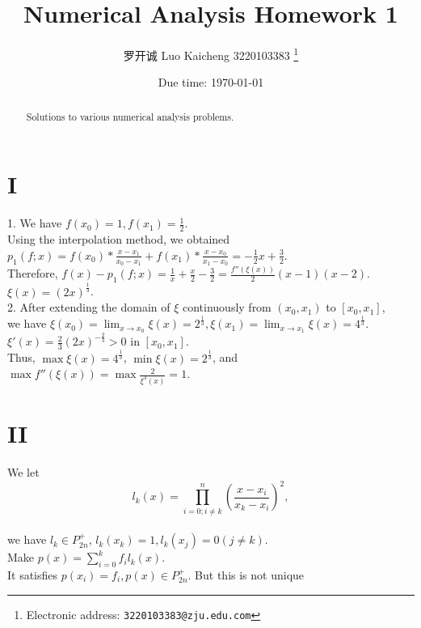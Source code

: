 \documentclass[a4paper]{article}
\begin{document}
\title{Numerical Analysis Homework 1}

\author{罗开诚 Luo Kaicheng 3220103383
  \thanks{Electronic address: \texttt{3220103383@zju.edu.com}}}

\date{Due time: \today}

\maketitle

\begin{abstract}
    Solutions to various numerical analysis problems.
\end{abstract}


\section*{I}
1. We have \( f(x_0) = 1, f(x_1) = \frac{1}{2} \). \\
Using the interpolation method, we obtained \\
\( p_1(f; x) = f(x_0)*\frac{x-x_1}{x_0-x_1}+f(x_1)*\frac{x-x_0}{x_1-x_0}= -\frac{1}{2}x + \frac{3}{2} \). \\
Therefore, \( f(x) - p_1(f; x) = \frac{1}{x} + \frac{x}{2} - \frac{3}{2} = \frac{f''(\xi(x))}{2}(x - 1)(x - 2) \). \\
\( \xi(x) = (2x)^{\frac{1}{3}} \).
\\
2. After extending the domain of \( \xi \) continuously from \( (x_0, x_1) \) to \( [x_0, x_1] \), \\
we have \( \xi(x_0) = \lim_{x \to x_0} \xi(x) = 2^{\frac{1}{3}}, \xi(x_1) = \lim_{x \to x_1} \xi(x) = 4^{\frac{1}{3}} \). \( \xi'(x) = \frac{2}{3}(2x)^{-\frac{2}{3}} > 0 \) in \( [x_0, x_1] \).\\
 Thus, \( \max \xi(x) = 4^{\frac{1}{3}} \), \( \min \xi(x) = 2^{\frac{1}{3}} \), and \( \max f''(\xi(x)) = \max \frac{2}{\xi^3(x)} = 1 \).
\\
\section*{II}
We let
\[
l_k(x) = \prod_{i=0; i \neq k}^n \left( \frac{x - x_i}{x_k - x_i} \right)^2,
\]
\\we have \( l_k \in P_{2n}^{+} \),  \(l_k(x_k)=1,l_k(x_j)=0 (j \neq k) \).\\
Make \( p(x) = \sum_{i=0}^{k} f_i l_k(x) \).\\
It satisfies \( p(x_i) = f_i, p(x) \in P_{2n}^{+} \).
But this is not unique\\
\end{document}

